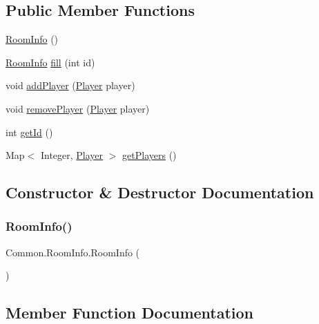 \subsection*{Public Member Functions}
\begin{DoxyCompactItemize}
\item 
\mbox{\hyperlink{classCommon_1_1RoomInfo_a58cd1b1961ee4539d4cc137760f06332}{Room\+Info}} ()
\item 
\mbox{\hyperlink{classCommon_1_1RoomInfo}{Room\+Info}} \mbox{\hyperlink{classCommon_1_1RoomInfo_ad73d9b718201741f4198b0feeb570f1b}{fill}} (int id)
\item 
void \mbox{\hyperlink{classCommon_1_1RoomInfo_a1681cb7be4e828c16e71285474be9758}{add\+Player}} (\mbox{\hyperlink{classCommon_1_1Player}{Player}} player)
\item 
void \mbox{\hyperlink{classCommon_1_1RoomInfo_ab167bc6ee6568c92d8135622564887b9}{remove\+Player}} (\mbox{\hyperlink{classCommon_1_1Player}{Player}} player)
\item 
int \mbox{\hyperlink{classCommon_1_1RoomInfo_a35582362944dac3d9de2d223f828e90a}{get\+Id}} ()
\item 
Map$<$ Integer, \mbox{\hyperlink{classCommon_1_1Player}{Player}} $>$ \mbox{\hyperlink{classCommon_1_1RoomInfo_a166f72c0cde4165d337f591d68ffe313}{get\+Players}} ()
\end{DoxyCompactItemize}


\subsection{Constructor \& Destructor Documentation}
\mbox{\label{classCommon_1_1RoomInfo_a58cd1b1961ee4539d4cc137760f06332}} 
\subsubsection{\texorpdfstring{Room\+Info()}{RoomInfo()}}
{\footnotesize\ttfamily Common.\+Room\+Info.\+Room\+Info (\begin{DoxyParamCaption}{ }\end{DoxyParamCaption})\hspace{0.3cm}{\ttfamily [inline]}}



\subsection{Member Function Documentation}
\mbox{\label{classCommon_1_1RoomInfo_a1681cb7be4e828c16e71285474be9758}} 
